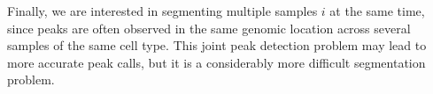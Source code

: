\documentclass{article}
\begin{document}
Finally, we are interested in segmenting multiple samples $i$ at the
same time, since peaks are often observed in the same genomic location
across several samples of the same cell type. This joint peak
detection problem may lead to more accurate peak calls, but it is a
considerably more difficult segmentation problem.




\end{document}
